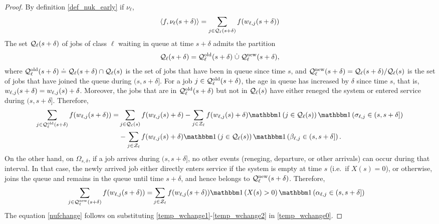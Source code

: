 \documentclass{article}
\theoremstyle{definition}
\numberwithin{equation}{section}
\begin{document}
\begin{proof}
  By definition \eqref{def_nuk_early} if $\nu_\ell$,
  \begin{equation}\label{temp_wchange0}
    \langle f,\nu_\ell(s+\delta)\rangle=\sum_{j\in\mathcal{Q}_\ell(s+\delta)} f(w_{\ell,j}(s+\delta))
  \end{equation}
  The set $\mathcal{Q}_\ell(s+\delta)$ of jobs of class $\ell$ waiting in queue at time $s+\delta$ admits the partition
  \begin{align}\label{temp_wchange1}
	\mathcal{Q}_\ell(s+\delta) = \mathcal{Q}_\ell^{\text{old}}(s+\delta)\; \dot\cup \;\mathcal{Q}_\ell^\text{new}(s+\delta),
  \end{align}
where   $\mathcal{Q}_\ell^{\text{old}}(s+\delta)\doteq \mathcal{Q}_\ell(s+\delta) \cap \mathcal{Q}_\ell(s)$ is the set of jobs that have been in queue since time $s$, and  $\mathcal{Q}_\ell^\text{new}(s+\delta) = \mathcal{Q}_\ell(s+\delta) / \mathcal{Q}_\ell(s)$ is the set of jobs that have joined the queue during $(s,s+\delta]$. For a job $j\in\mathcal{Q}_\ell^{\text{old}}(s+\delta)$, the age in queue has increased by $\delta$ since time $s$, that is, $w_{\ell,j}(s+\delta)=w_{\ell,j}(s)+\delta$. Moreover, the jobs that are in $\mathcal{Q}_\ell^{\text{old}}(s+\delta)$ but not in $\mathcal{Q}_\ell(s)$ have either reneged the system or entered service during $(s,s+\delta]$. Therefore,
\begin{align}
	\sum_{j\in\inque_\ell^{\text{old}}(s+\delta)} f(w_{\ell,j}(s+\delta)) = & 	\sum_{j\in\inque_\ell(s)} f(w_{\ell,j}(s)+\delta) - \sum_{j\in\indexSet_\ell}f(w_{\ell,j}(s)+\delta)\indic{j\in\inque_\ell(s)} \indic{\renegtime_{\ell,j}\in(s,s+\delta]} \notag\\
	      & - \sum_{j\in\indexSet_\ell}f(w_{\ell,j}(s)+\delta)\indic{j\in\inque_\ell(s)}\indic{\entrytime_{\ell,j}\in(s,s+\delta]}.
\end{align}
On the other hand, on $\Omega_{s,\delta}$, if a job arrives during $(s,s+\delta]$, no other events (reneging, departure, or other arrivals) can occur during that interval. In that case, the newly arrived job either directly enters service if the system is empty at time $s$ (i.e.\ if $X(s)=0$), or otherwise, joins the queue and remains in the queue until time $s+\delta$, and hence belongs to $\mathcal{Q}_\ell^\text{new}(s+\delta)$. Therefore,
\begin{align}\label{temp_wchange2}
\sum_{j\in\inque_\ell^\text{new}(s+\delta)} f(w_{\ell,j}(s+\delta)) =  & \sum_{j\in\indexSet_\ell}f(w_{\ell,j}(s+\delta))\indic{X(s)>0}\indic{\arrivaltime_{\ell,j}\in(s,s+\delta]}
\end{align}
The equation \eqref{nufchange} follows on substituting \eqref{temp_wchange1}-\eqref{temp_wchange2} in \eqref{temp_wchange0}.

\end{proof}
\end{document}
